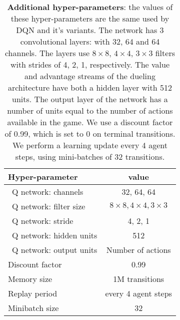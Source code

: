 \documentclass[letterpaper]{article} %
\begin{document}
\vspace{3em}

\begin{table}[h!]
\centering
\begin{tabular}{ l | c }
\hline
Hyper-parameter           & value \\
\hline
 \ Q network: channels     &  32, 64, 64 \\
 \ Q network: filter size  &  $8\times8, 4\times4, 3\times3$ \\
 \ Q network: stride       &  4, 2, 1 \\
 \ Q network: hidden units         &  512 \\
 \ Q network: output units         & Number of actions \\
  Discount factor               & 0.99 \\
  Memory size            & 1M transitions \\ 
  Replay period          & every 4 agent steps \\
  Minibatch size         & 32 \\
\hline

\end{tabular}
\caption{\textbf{Additional hyper-parameters}: the values of these hyper-parameters are the same used by DQN and it's variants. The network has 3 convolutional layers: with 32, 64 and 64 channels. The layers use $8\times8$, $4\times4$, $3\times3$ filters with strides of 4, 2, 1, respectively. The value and advantage streams of the dueling architecture have both a hidden layer with 512 units. The output layer of the network has a number of units equal to the number of actions available in the game. We use a discount factor of 0.99, which is set to 0 on terminal transitions. We perform a learning update every 4 agent steps, using mini-batches of 32 transitions.
}
\label{tab:other_hyperparams}
\end{table}

\newpage
\end{document}
